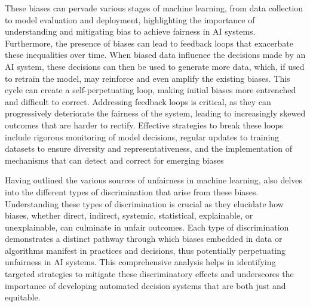 These biases can pervade various stages of machine learning, from data collection to model evaluation and deployment, highlighting the importance of understanding and mitigating bias to achieve fairness in AI systems. Furthermore, the presence of biases can lead to feedback loops that exacerbate these inequalities over time. When biased data influence the decisions made by an AI system, these decisions can then be used to generate more data, which, if used to retrain the model, may reinforce and even amplify the existing biases. This cycle can create a self-perpetuating loop, making initial biases more entrenched and difficult to correct. Addressing feedback loops is critical, as they can progressively deteriorate the fairness of the system, leading to increasingly skewed outcomes that are harder to rectify. Effective strategies to break these loops include rigorous monitoring of model decisions, regular updates to training datasets to ensure diversity and representativeness, and the implementation of mechanisms that can detect and correct for emerging biases

Having outlined the various sources of unfairness in machine learning, \citet{Mehrabi2019} also delves into the different types of discrimination that arise from these biases. Understanding these types of discrimination is crucial as they elucidate how biases, whether direct, indirect, systemic, statistical, explainable, or unexplainable, can culminate in unfair outcomes. Each type of discrimination demonstrates a distinct pathway through which biases embedded in data or algorithms manifest in practices and decisions, thus potentially perpetuating unfairness in AI systems. This comprehensive analysis helps in identifying targeted strategies to mitigate these discriminatory effects and underscores the importance of developing automated decision systems that are both just and equitable.


